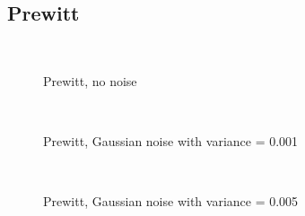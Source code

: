 \documentclass[10pt,a4paper]{article}
\begin{document}
\subsection{Prewitt}
\begin{figure}[H]
  \centering
     \\
  \caption{Prewitt, no noise}
  \label{fig:prewitt_no_noise}
\end{figure}
\begin{figure}[H]
  \centering
     \\
  \caption{Prewitt, Gaussian noise with variance = 0.001}
  \label{fig:prewitt_001}
\end{figure}
\begin{figure}[H]
  \centering
     \\
  \caption{Prewitt, Gaussian noise with variance = 0.005}
  \label{fig:prewitt_005}
\end{figure}
\end{document}
